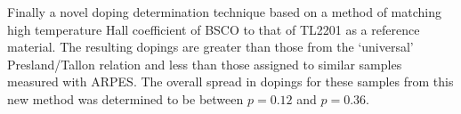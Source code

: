 Finally a novel doping determination technique based on a method of matching high temperature Hall coefficient of \ac{BSCO} to that of \ac{TL2201} as a reference material. The resulting dopings are greater than those from the `universal' Presland/Tallon relation and less than those assigned to similar samples measured with \ac{ARPES}. The overall spread in dopings for these samples from this new method was determined to be between $p=0.12$ and $p=0.36$.

